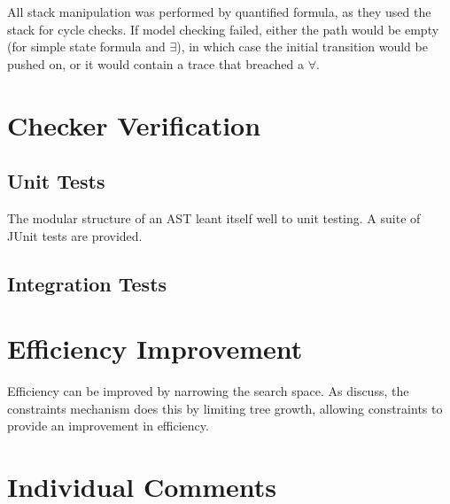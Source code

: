 \documentclass[a4paper,11pt]{article}
\begin{document}
	All stack manipulation was performed by quantified formula, as they used the stack for cycle checks. If model checking failed, either the path would be empty (for simple state formula and $\exists$), in which case the initial transition would be pushed on, or it would contain a trace that breached a $\forall$.
	
	\section{Checker Verification}
	\subsection{Unit Tests}
	The modular structure of an AST leant itself well to unit testing. A suite of JUnit tests are provided.
	
	\subsection{Integration Tests}
	
	\section{Efficiency Improvement}
	Efficiency can be improved by narrowing the search space. As discuss, the constraints mechanism does this by limiting tree growth, allowing constraints to provide an improvement in efficiency.
	
	\section{Individual Comments}
	
		
		
		
		
		
\end{document}
